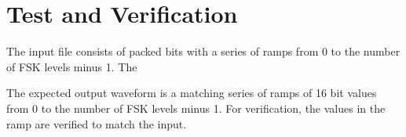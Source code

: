 \documentclass{article}
\begin{document}
\section*{Test and Verification}
\begin{flushleft}
	The input file consists of packed bits with a series of ramps from 0 to the number of FSK levels minus 1. The \medskip
	
	The expected output waveform is a matching series of ramps of 16 bit values from 0 to the number of FSK levels minus 1. For verification, the values in the ramp are verified to match the input.
\end{flushleft}
\end{document}
